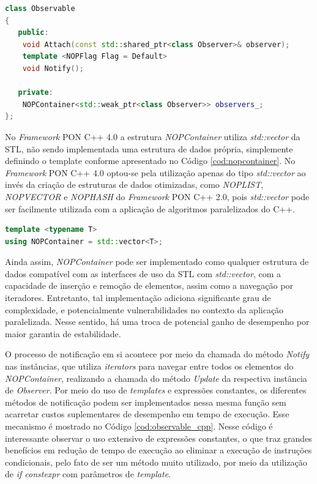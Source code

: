 \begin{lstlisting}[language=C++, float=htb,
caption = {Implementação da classe \textit{Observable} no \textit{Framework} PON C++ 4.0},
source = {Autoria própria},
label = {cod:observable_h}]
class Observable
{
   public:
    void Attach(const std::shared_ptr<class Observer>& observer);
    template <NOPFlag Flag = Default>
    void Notify();

   private:
    NOPContainer<std::weak_ptr<class Observer>> observers_;
};
\end{lstlisting}
\FloatBarrier

No \textit{Framework} PON C++ 4.0 a estrutura \textit{NOPContainer} utiliza
\textit{std::vector} da STL, não sendo implementada uma estrutura de dados
própria, simplemente definindo o template conforme apresentado no Código
\ref{cod:nopcontainer}. No \textit{Framework} PON C++ 4.0 optou-se pela
utilização apenas do tipo \textit{std::vector} ao invés da criação de estruturas
de dados otimizadas, como \textit{NOPLIST}, \textit{NOPVECTOR} e
\textit{NOPHASH} do \textit{Framework} PON C++ 2.0, pois \textit{std::vector}
pode ser facilmente utilizada com a aplicação de algoritmos paralelizados do
C++.

\begin{lstlisting}[language=C++, float=htb,
caption = {Definição de \textit{NOPContainer} no \textit{Framework} PON C++ 4.0},
source = {Autoria própria},
label = {cod:nopcontainer}]
template <typename T>
using NOPContainer = std::vector<T>;
\end{lstlisting}

Ainda assim, \textit{NOPContainer} pode ser implementado como qualquer estrutura
de dados compatível com as interfaces de uso da STL com \textit{std::vector},
com a capacidade de inserção e remoção de elementos, assim como a navegação por
iteradores. Entretanto, tal implementação adiciona significante grau de
complexidade, e potencialmente vulnerabilidades no contexto da aplicação
paralelizada. Nesse sentido, há uma troca de potencial ganho de desempenho por
maior garantia de estabilidade.

O processo de notificação em si acontece por meio da chamada do método
\textit{Notify} nas instâncias, que utiliza \textit{iterators} para navegar
entre todos os elementos do \textit{NOPContainer}, realizando a chamada do
método \textit{Update} da respectiva instância de \textit{Observer}. Por meio
do uso de \textit{templates} e expressões constantes, os diferentes métodos de
notificação podem ser implementados nessa mesma função sem acarretar custos
suplementares de desempenho em tempo de execução. Esse mecanismo é mostrado no
Código \ref{cod:observable_cpp}. Nesse código é interessante observar o uso
extensivo de expressões constantes, o que traz grandes benefícios em redução de
tempo de execução ao eliminar a execução de instruções condicionais, pelo fato
de ser um método muito utilizado, por meio da utilização de \textit{if
constexpr} com parâmetros de \textit{template}.


